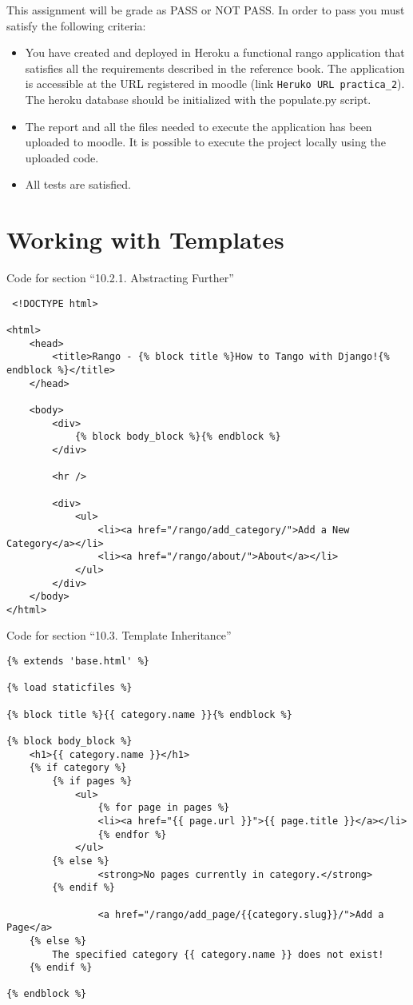 \documentclass[12pt]{article} %
\begin{document}
This assignment will be grade as PASS or NOT PASS.
In order to pass you must satisfy the following criteria:

\begin{itemize}
 \item You have created and deployed in Heroku a functional rango application that satisfies all the requirements described in the reference book. The application is accessible at the URL registered in  moodle (link \texttt{Heruko URL practica\_2}). The heroku database should be initialized with the populate.py script.
 \item The report and all the files needed to execute the application has been uploaded to moodle. It is possible to execute the project locally using the uploaded code.
 \item All tests are satisfied.
\end{itemize}


\newpage
\appendix

\section{Working with Templates}
\label{app:workingWithTemplates}
Code for section ``10.2.1. Abstracting Further''

\begin{verbatim}
 <!DOCTYPE html>

<html>
    <head>
        <title>Rango - {% block title %}How to Tango with Django!{% endblock %}</title>
    </head>

    <body>
        <div>
            {% block body_block %}{% endblock %}
        </div>

        <hr />

        <div>
            <ul>
                <li><a href="/rango/add_category/">Add a New Category</a></li>
                <li><a href="/rango/about/">About</a></li>
            </ul>
        </div>
    </body>
</html>
\end{verbatim}

Code for section ``10.3. Template Inheritance''

\begin{verbatim}
{% extends 'base.html' %}

{% load staticfiles %}

{% block title %}{{ category.name }}{% endblock %}

{% block body_block %}
    <h1>{{ category.name }}</h1>
    {% if category %}
        {% if pages %}
            <ul>
                {% for page in pages %}
                <li><a href="{{ page.url }}">{{ page.title }}</a></li>
                {% endfor %}
            </ul>
        {% else %}
                <strong>No pages currently in category.</strong>
        {% endif %}

                <a href="/rango/add_page/{{category.slug}}/">Add a Page</a>
    {% else %}
        The specified category {{ category.name }} does not exist!
    {% endif %}

{% endblock %}
\end{verbatim}
\end{document}
